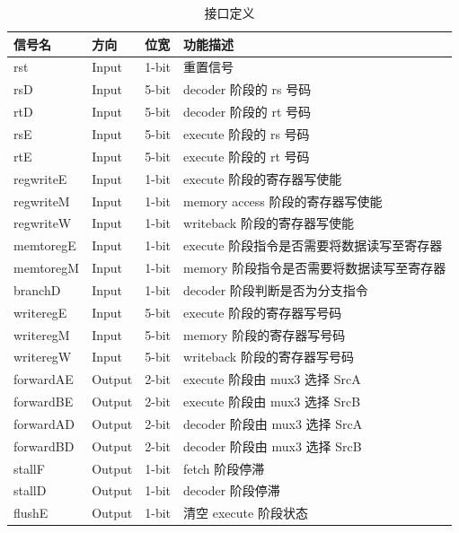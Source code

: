\begin{table}[H]
	\caption{接口定义}\label{tab:signaldef}
	\begin{center}
	\begin{tabular}{lllp{6cm}}
	\hline
	\textbf{信号名} & \textbf{方向} & \textbf{位宽} & \textbf{功能描述} \\ \hline \hline
	rst & Input & 1-bit & 重置信号 \\ \hline
	rsD & Input & 5-bit & decoder 阶段的 rs 号码 \\ \hline
	rtD & Input & 5-bit & decoder 阶段的 rt 号码 \\ \hline
	rsE & Input & 5-bit & execute 阶段的 rs 号码 \\ \hline
	rtE & Input & 5-bit & execute 阶段的 rt 号码 \\ \hline
	regwriteE & Input & 1-bit & execute 阶段的寄存器写使能 \\ \hline
	regwriteM & Input & 1-bit & memory access 阶段的寄存器写使能 \\ \hline
	regwriteW & Input & 1-bit & writeback 阶段的寄存器写使能 \\ \hline
	memtoregE & Input & 1-bit & execute 阶段指令是否需要将数据读写至寄存器 \\ \hline
	memtoregM & Input & 1-bit & memory 阶段指令是否需要将数据读写至寄存器 \\ \hline
	branchD & Input & 1-bit & decoder 阶段判断是否为分支指令 \\ \hline
	writeregE & Input & 5-bit & execute 阶段的寄存器写号码 \\ \hline
	writeregM & Input & 5-bit & memory 阶段的寄存器写号码 \\ \hline
	writeregW & Input & 5-bit & writeback 阶段的寄存器写号码 \\ \hline
	forwardAE & Output & 2-bit & execute 阶段由 mux3 选择 SrcA \\ \hline
	forwardBE & Output & 2-bit & execute 阶段由 mux3 选择 SrcB \\ \hline
	forwardAD & Output & 2-bit & decoder 阶段由 mux3 选择 SrcA \\ \hline
	forwardBD & Output & 2-bit & decoder 阶段由 mux3 选择 SrcB \\ \hline
	stallF & Output & 1-bit & fetch 阶段停滞 \\ \hline
	stallD & Output & 1-bit & decoder 阶段停滞 \\ \hline
	flushE & Output & 1-bit & 清空 execute 阶段状态 \\ \hline
	\end{tabular}
	\end{center}
	\end{table}